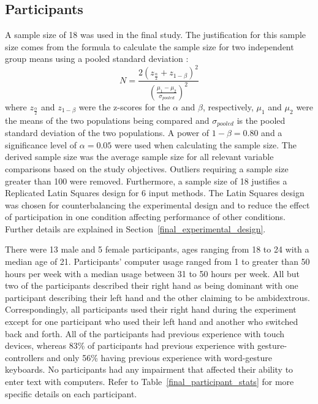\subsection{Participants} \label{final_participants}
A sample size of 18 was used in the final study. The justification for this sample size comes from the formula to calculate the sample size for two independent group means using a pooled standard deviation \cite{ref_sample_size}:
\begin{equation}
N = \frac{2(z_{\frac{\alpha}{2}} + z_{1-\beta})^2}{(\frac{\mu_1 - \mu_2}{\sigma_{pooled}})^2}
\end{equation}
where $z_{\frac{\alpha}{2}}$ and $z_{1-\beta}$ were the z-scores for the $\alpha$ and $\beta$, respectively, $\mu_1$ and $\mu_2$ were the means of the two populations being compared and $\sigma_{pooled}$ is the pooled standard deviation of the two populations. A power of $1-\beta = 0.80$ and a significance level of $\alpha = 0.05$ were used when calculating the sample size. The derived sample size was the average sample size for all relevant variable comparisons based on the study objectives. Outliers requiring a sample size greater than 100 were removed. Furthermore, a sample size of 18 justifies a Replicated Latin Squares design for 6 input methods. The Latin Squares design was chosen for counterbalancing the experimental design and to reduce the effect of participation in one condition affecting performance of other conditions. Further details are explained in Section~\ref{final_experimental_design}.

There were 13 male and 5 female participants, ages ranging from 18 to 24 with a median age of 21. Participants' computer usage ranged from 1 to greater than 50 hours per week with a median usage between 31 to 50 hours per week. All but two of the participants described their right hand as being dominant with one participant describing their left hand and the other claiming to be ambidextrous. Correspondingly, all participants used their right hand during the experiment except for one participant who used their left hand and another who switched back and forth. All of the participants had previous experience with touch devices, whereas 83\% of participants had previous experience with gesture-controllers and only 56\% having previous experience with word-gesture keyboards. No participants had any impairment that affected their ability to enter text with computers. Refer to Table~\ref{final_participant_stats} for more specific details on each participant.

